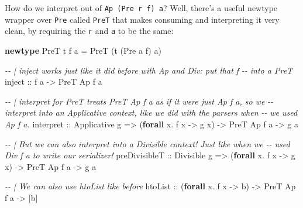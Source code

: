 \documentclass[]{article}
\newenvironment{Shaded}{}{}
\newcommand{\CommentTok}[1]{\textcolor[rgb]{0.38,0.63,0.69}{\textit{#1}}}
\newcommand{\DataTypeTok}[1]{\textcolor[rgb]{0.56,0.13,0.00}{#1}}
\newcommand{\KeywordTok}[1]{\textcolor[rgb]{0.00,0.44,0.13}{\textbf{#1}}}
\newcommand{\NormalTok}[1]{#1}
\newcommand{\OperatorTok}[1]{\textcolor[rgb]{0.40,0.40,0.40}{#1}}
\newcommand{\OtherTok}[1]{\textcolor[rgb]{0.00,0.44,0.13}{#1}}
\begin{document}
How do we interpret out of \texttt{Ap\ (Pre\ r\ f)\ a}? Well, there's a useful
newtype wrapper over \texttt{Pre} called \texttt{PreT} that makes consuming and
interpreting it very clean, by requiring the \texttt{r} and \texttt{a} to be the
same:

\begin{Shaded}
\begin{Highlighting}[]
\KeywordTok{newtype} \DataTypeTok{PreT}\NormalTok{ t f a }\OtherTok{=} \DataTypeTok{PreT}\NormalTok{ (t (}\DataTypeTok{Pre}\NormalTok{ a f) a)}

\CommentTok{{-}{-} | \textasciigrave{}inject\textasciigrave{} works just like it did before with \textasciigrave{}Ap\textasciigrave{} and \textasciigrave{}Div\textasciigrave{}: put that \textasciigrave{}f\textasciigrave{}}
\CommentTok{{-}{-} into a \textasciigrave{}PreT\textasciigrave{}}
\OtherTok{inject ::}\NormalTok{ f a }\OtherTok{{-}>} \DataTypeTok{PreT} \DataTypeTok{Ap}\NormalTok{ f a}

\CommentTok{{-}{-} | interpret for PreT treats \textasciigrave{}PreT Ap f a\textasciigrave{} as if it were just \textasciigrave{}Ap f a\textasciigrave{}, so we}
\CommentTok{{-}{-} interpret into an \textasciigrave{}Applicative\textasciigrave{} context, like we did with the parsers when}
\CommentTok{{-}{-} we used \textasciigrave{}Ap f a\textasciigrave{}.}
\NormalTok{interpret}
\OtherTok{    ::} \DataTypeTok{Applicative}\NormalTok{ g}
    \OtherTok{=>}\NormalTok{ (}\KeywordTok{forall}\NormalTok{ x}\OperatorTok{.}\NormalTok{ f x }\OtherTok{{-}>}\NormalTok{ g x)}
    \OtherTok{{-}>} \DataTypeTok{PreT} \DataTypeTok{Ap}\NormalTok{ f a}
    \OtherTok{{-}>}\NormalTok{ g a}

\CommentTok{{-}{-} | But we can also interpret into a \textasciigrave{}Divisible\textasciigrave{} context!  Just like when we}
\CommentTok{{-}{-} used \textasciigrave{}Div f a\textasciigrave{} to write our serializer!}
\NormalTok{preDivisibleT}
\OtherTok{    ::} \DataTypeTok{Divisible}\NormalTok{ g}
    \OtherTok{=>}\NormalTok{ (}\KeywordTok{forall}\NormalTok{ x}\OperatorTok{.}\NormalTok{ f x }\OtherTok{{-}>}\NormalTok{ g x)}
    \OtherTok{{-}>} \DataTypeTok{PreT} \DataTypeTok{Ap}\NormalTok{ f a}
    \OtherTok{{-}>}\NormalTok{ g a}

\CommentTok{{-}{-} | We can also use htoList like before}
\NormalTok{htoList}
\OtherTok{    ::}\NormalTok{ (}\KeywordTok{forall}\NormalTok{ x}\OperatorTok{.}\NormalTok{ f x }\OtherTok{{-}>}\NormalTok{ b)}
    \OtherTok{{-}>} \DataTypeTok{PreT} \DataTypeTok{Ap}\NormalTok{ f a}
    \OtherTok{{-}>}\NormalTok{ [b]}
\end{Highlighting}
\end{Shaded}
\end{document}
